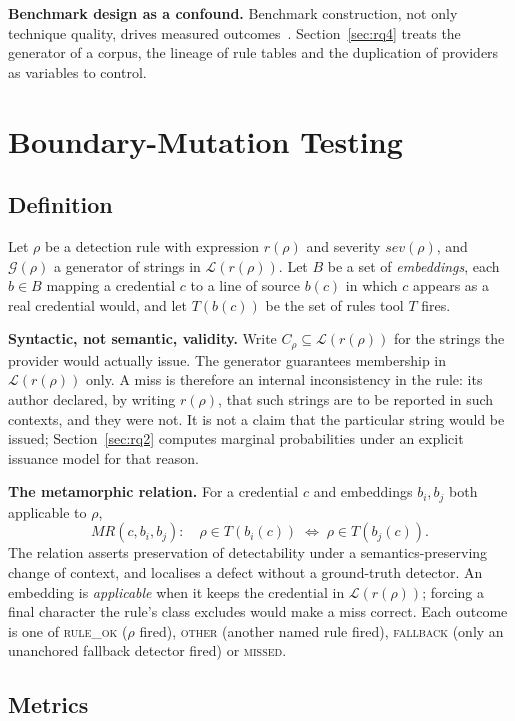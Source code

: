 \documentclass[10pt,journal,compsoc]{IEEEtran}
\begin{document}
\textbf{Benchmark design as a confound.} Benchmark construction, not only technique quality, drives measured outcomes~\cite{liem2020,herbold2020}. Section~\ref{sec:rq4} treats the generator of a corpus, the lineage of rule tables and the duplication of providers as variables to control.

\section{Boundary-Mutation Testing}
\label{sec:method}

\subsection{Definition}

Let $\rho$ be a detection rule with expression $r(\rho)$ and severity $sev(\rho)$, and $\mathcal{G}(\rho)$ a generator of strings in $\mathcal{L}(r(\rho))$. Let $B$ be a set of \emph{embeddings}, each $b\in B$ mapping a credential $c$ to a line of source $b(c)$ in which $c$ appears as a real credential would, and let $T(b(c))$ be the set of rules tool $T$ fires.

\textbf{Syntactic, not semantic, validity.} Write $C_\rho\subseteq\mathcal{L}(r(\rho))$ for the strings the provider would actually issue. The generator guarantees membership in $\mathcal{L}(r(\rho))$ only. A miss is therefore an internal inconsistency in the rule: its author declared, by writing $r(\rho)$, that such strings are to be reported in such contexts, and they were not. It is not a claim that the particular string would be issued; Section~\ref{sec:rq2} computes marginal probabilities under an explicit issuance model for that reason.

\textbf{The metamorphic relation.} For a credential $c$ and embeddings $b_i,b_j$ both applicable to $\rho$,
\[
\mathit{MR}(c,b_i,b_j):\quad \rho\in T(b_i(c)) \;\Longleftrightarrow\; \rho\in T(b_j(c)).
\]
The relation asserts preservation of detectability under a semantics-preserving change of context, and localises a defect without a ground-truth detector. An embedding is \emph{applicable} when it keeps the credential in $\mathcal{L}(r(\rho))$; forcing a final character the rule's class excludes would make a miss correct. Each outcome is one of \textsc{rule\_ok} ($\rho$ fired), \textsc{other} (another named rule fired), \textsc{fallback} (only an unanchored fallback detector fired) or \textsc{missed}.

\subsection{Metrics}
\label{sec:metrics}
\end{document}
